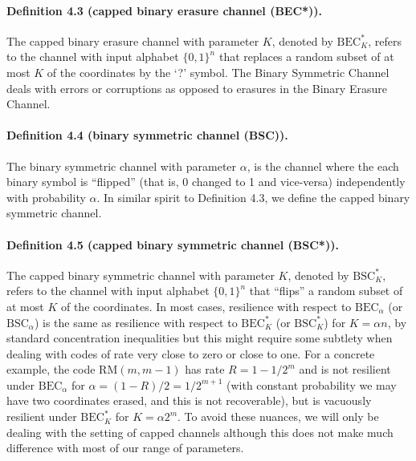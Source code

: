 \documentclass[10pt,a4paper]{article}
\begin{document}
\paragraph{Definition 4.3 (capped binary erasure channel (BEC*)).} The capped binary erasure channel with parameter $K$, denoted by $\mathrm{BEC}_K^*$, refers to the channel with input alphabet $\{0,1\}^n$ that replaces a random subset of at most $K$ of the coordinates by the `?' symbol.
The Binary Symmetric Channel deals with errors or corruptions as opposed to erasures in the Binary Erasure Channel.
\paragraph{Definition 4.4 (binary symmetric channel (BSC)).} The binary symmetric channel with parameter $\alpha$, is the channel where the each binary symbol is ``flipped'' (that is, 0 changed to 1 and vice-versa) independently with probability $\alpha$.
In similar spirit to Definition 4.3, we define the capped binary symmetric channel.
\paragraph{Definition 4.5 (capped binary symmetric channel (BSC*)).} The capped binary symmetric channel with parameter $K$, denoted by $\mathrm{BSC}_K^*$, refers to the channel with input alphabet $\{0,1\}^n$ that ``flips'' a random subset of at most $K$ of the coordinates.
In most cases, resilience with respect to $\mathrm{BEC}_\alpha$ (or $\mathrm{BSC}_\alpha$) is the same as resilience with respect to $\mathrm{BEC}_K^*$ (or $\mathrm{BSC}_K^*$) for $K=\alpha n$, by standard concentration inequalities but this might require some subtlety when dealing with codes of rate very close to zero or close to one. For a concrete example, the code $\mathrm{RM}(m,m-1)$ has rate $R=1-1/2^m$ and is not resilient under $\mathrm{BEC}_\alpha$ for $\alpha=(1-R)/2=1/2^{m+1}$ (with constant probability we may have two coordinates erased, and this is not recoverable), but is vacuously resilient under $\mathrm{BEC}_K^*$ for $K=\alpha2^m$. To avoid these nuances, we will only be dealing with the setting of capped channels although this does not make much difference with most of our range of parameters.
\end{document}
